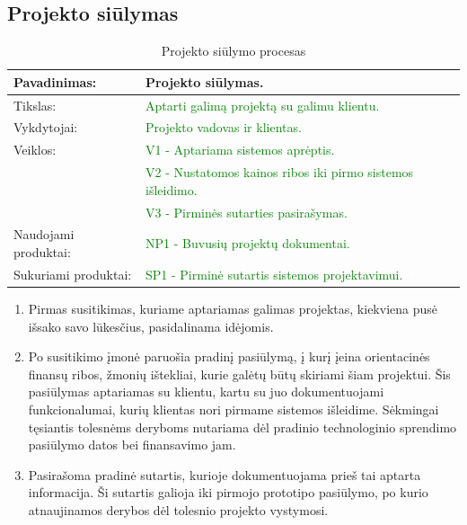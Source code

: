 \documentclass{VUMIFPSkursinis}
\begin{document}
	\newpage

	\subsection{Projekto siūlymas}
	\begin{center}
		\begin{table}[ht]
			\caption{Projekto siūlymo procesas}
			\begin{tabular}{ | l | l | }
				\hline
				Pavadinimas:		& Projekto siūlymas.						\\ \hline
				Tikslas:		& \textcolor{green}{Aptarti galimą projektą su galimu klientu.}			\\ \hline
				Vykdytojai:		& \textcolor{green}{Projekto vadovas ir klientas.}					\\ \hline
				Veiklos:		& \textcolor{green}{V1 - Aptariama sistemos aprėptis. }				\\
							& \textcolor{green}{V2 - Nustatomos kainos ribos iki pirmo sistemos išleidimo.}	\\
							&\textcolor{green}{ V3 - Pirminės sutarties pasirašymas.}				\\ \hline
				Naudojami produktai:	& \textcolor{green}{NP1 - Buvusių projektų dokumentai. }				\\ \hline
				Sukuriami produktai:	& \textcolor{green}{SP1 - Pirminė sutartis sistemos projektavimui.	}	\\ \hline
			\end{tabular}
		\end{table}
	\end{center}

	\begin{enumerate}
		\item{
			Pirmas susitikimas, kuriame aptariamas galimas projektas, kiekviena pusė išsako savo lūkesčius, pasidalinama idėjomis.
		}
		\item{
			Po susitikimo įmonė paruošia pradinį pasiūlymą, į kurį įeina orientacinės finansų ribos, žmonių ištekliai, kurie galėtų būtų skiriami šiam projektui.
			Šis pasiūlymas aptariamas su klientu, kartu su juo dokumentuojami funkcionalumai, kurių klientas nori pirmame sistemos išleidime.
			Sėkmingai tęsiantis tolesnėms deryboms nutariama dėl pradinio technologinio sprendimo pasiūlymo datos bei finansavimo jam.
		}
		\item{
			Pasirašoma pradinė sutartis, kurioje dokumentuojama prieš tai aptarta informacija.
			Ši sutartis galioja iki pirmojo prototipo pasiūlymo, po kurio atnaujinamos derybos dėl tolesnio projekto vystymosi.
		}
	\end{enumerate}
\end{document}
